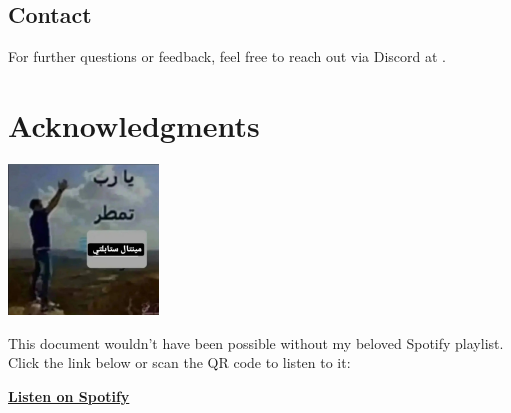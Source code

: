 \documentclass{article}
\begin{document}
\subsection*{Contact}

For further questions or feedback, feel free to reach out via Discord at  \! .

\section*{Acknowledgments}

\begin{tcolorbox}[
    colback=black,         %
    colframe=spotifygreen, %
    width=\textwidth,      %
    boxrule=1mm,           %
    sharp corners=south,   %
    arc=5mm,               %
    fontupper=\color{white}\sffamily, %
    title=\textbf{\huge \textcolor{white}{\faSpotify} Spotify Playlist},
    coltitle=white,        %
    attach boxed title to top left={yshift=-2mm, xshift=5mm},
    boxed title style={colback=black, sharp corners}
]
    \begin{center}
        \includegraphics[width=4cm,clip,trim=0 0 0 0]{playlist_cover.jpg}

        \vspace{0.5cm}

        This document wouldn't have been possible without my beloved Spotify playlist.\\ Click the link below or scan the QR code to listen to it:

        \vspace{0.5cm}

        \href{https://open.spotify.com/playlist/5iKzfelUIiTW2IHZWqRzKC}{%
            \textcolor{spotifygreen}{\Large \textbf{Listen on Spotify}}%
        }

        \vspace{0.5cm}

    \end{center}
\end{tcolorbox}
\end{document}
